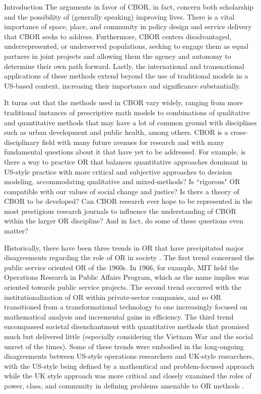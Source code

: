\documentclass[12pt]{pom_thesis}
\theoremstyle{definition}
\begin{document}
\begin{chapter}{Introduction}
	The arguments in favor of CBOR, in fact, concern both scholarship and the possibility of (generally speaking) improving lives. There is a vital importance of space, place, and community in policy design and service delivery that CBOR seeks to address. Furthermore, CBOR centers disadvantaged, underrepresented, or underserved populations, seeking to engage them as equal partners in joint projects and allowing them the agency and autonomy to determine their own path forward. Lastly, the international and transnational applications of these methods extend beyond the use of traditional models in a US-based context, increasing their importance and significance substantially.
	
	It turns out that the methods used in CBOR vary widely, ranging from more traditional instances of prescriptive math models to combinations of qualitative and quantitative methods that may have a lot of common ground with disciplines such as urban development and public health, among others. CBOR is a cross-disciplinary field with many future avenues for research and with many fundamental questions about it that have yet to be addressed. For example, is there a way to practice OR that balances quantitative approaches dominant in US-style practice with more critical and subjective approaches to decision modeling, accommodating qualitative and mixed-methods? Is ``rigorous" OR compatible with our values of social change and justice? Is there a theory of CBOR to be developed? Can CBOR research ever hope to be represented in the most prestigious research journals to influence the understanding of CBOR within the larger OR discipline? \cite{community-or} And in fact, do some of these questions even matter?
	
	Historically, there have been three trends in OR that have precipitated major disagreements regarding the role of OR in society \cite{community-or}. The first trend concerned the public service oriented OR  of the 1960s. In 1966, for example, MIT held the Operations Research in Public Affairs Program, which as the name implies was oriented towards public service projects. The second trend occurred with the institutionalization of OR within private-sector companies, and so OR transitioned from a transformational technology to one increasingly focused on mathematical analysis and incremental gains in efficiency. The third trend encompassed societal disenchantment with quantitative methods that promised much but delivered little (especially considering the Vietnam War and the social unrest of the times). Some of these trends were embodied in the long-ongoing disagreements between US-style operations researchers and UK-style researchers, with the US-style being defined by a mathemtical and problem-focused approach while the UK style approach was more critical and closely examined the roles of power, class, and community in defining problems amenable to OR methods \cite{community-or}.


\end{chapter}
\end{document}
